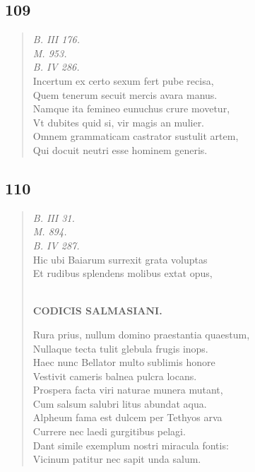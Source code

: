 \documentclass[11pt, a4paper]{report}
\begin{document}
            \subsection*{109}
      \begin{verse}
      \textit{B. III 176.} \\ \textit{M. 953.} \\ \textit{B. IV 286.} \\ Incertum ex certo sexum fert pube recisa, \\ Quem tenerum secuit mercis avara manus. \\ Namque ita femineo eunuchus crure movetur, \\ Vt dubites quid si, vir  \lbrack magis \rbrack  an mulier. \\ Omnem grammaticam castrator sustulit artem, \\ Qui docuit neutri esse hominem generis. \\ 
      \end{verse}
  
            \subsection*{110}
      \begin{verse}
      \textit{B. III 31.} \\ \textit{M. 894.} \\ \textit{B. IV 287.} \\ Hic ubi Baiarum surrexit grata voluptas \\ Et rudibus splendens molibus extat opus, \\ 
        ﻿\pagebreak 
    \begin{center} \textbf{CODICIS SALMASIANI.} \end{center} \marginpar{[129]} Rura prius, nullum domino praestantia quaestum, \\ Nullaque tecta tulit glebula frugis inops. \\ Haec nunc Bellator multo sublimis honore \\ Vestivit cameris balnea pulcra locans. \\ Prospera facta viri naturae munera mutant, \\ Cum salsum salubri litus abundat aqua. \\ Alpheum fama est dulcem per Tethyos arva \\ Currere nec laedi gurgitibus pelagi. \\ Dant simile exemplum nostri miracula fontis: \\ Vicinum patitur nec sapit unda salum. \\ 
      \end{verse}
  
\end{document}
